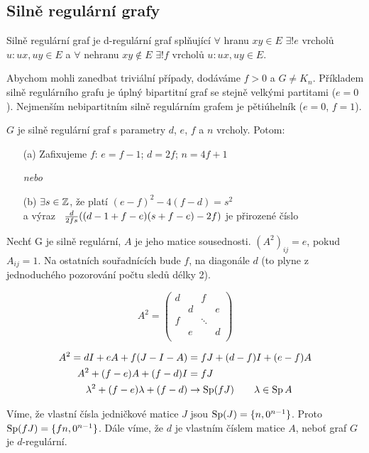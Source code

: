 \subsection{Silně regulární grafy}


\df Silně regulární graf je d-regulární graf splňující $\forall$ hranu $xy\in E$ $\exists!e$
vrcholů $u: ux,uy\in E$ a $\forall$ nehranu $xy\not\in E$ $\exists!f$ vrcholů
$u: ux,uy\in E$.

Abychom mohli zanedbat triviální případy, dodáváme $f>0$ a $G\neq K_n$.
Příkladem silně regulárního grafu je úplný bipartitní graf se stejně velkými
partitami ($e=0$). Nejmenším nebipartitním silně regulárním grafem je
pětiúhelník ($e=0$, $f=1$).

\vt $G$ je silně regulární graf s parametry $d$, $e$, $f$ a $n$ vrcholy. Potom:
\begin{enumerate}
	\item[(a)] Zafixujeme $f$: $e = f-1$; $d = 2f$; $n = 4f+1$
	\item[] {\it nebo}
	\item[(b)] $\exists s \in \mathbb{Z}$, že platí $(e-f)^2-4(f-d) = s^2$ \\
	a výraz \ ${d\over 2fs}((d-1+f-e)(s+f-e)-2f)$ je přirozené číslo
\end{enumerate}

\dk Nechť G je silně regulární, $A$ je jeho matice sousednosti. $(A^2)_{ij} =
e$, pokud $A_{ij} = 1$. Na ostatních souřadnících bude $f$, na diagonále $d$
(to plyne z jednoduchého pozorování počtu sledů délky 2).

$$
A^2 = \left(
	\begin{matrix}
		d & & f & \\
		& d & & e \\
		f & & \ddots & \\
		& e & & d\\
	\end{matrix}\right)
$$

\begin{align}
	A^2 = dI + eA + f(J-I-A) &= fJ + (d-f)I + (e-f)A \\
	A^2 + (f-e)A + (f-d)I &= fJ \\
	\lambda^2 + (f-e)\lambda + (f-d) &\rightarrow \operatorname{Sp}(fJ)\qquad \lambda\in\operatorname{Sp} A
\end{align}

Víme, že vlastní čísla jedničkové matice $J$ jsou $\operatorname{Sp}(J) = \{n, 0^{n-1}\}$.
Proto $\operatorname{Sp}(fJ) = \{fn, 0^{n-1}\}$. Dále víme, že $d$ je vlastním číslem matice
$A$, neboť graf $G$ je $d$-regulární.

